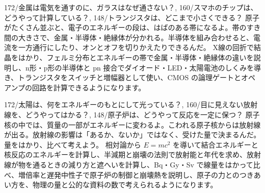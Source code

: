 %
  {172/{金属は電気を通すのに、ガラスはなぜ通さない？},
   160/{スマホのチップは、どうやって計算している？},
   148/{トランジスタは、どこまで小さくできる？}}%
  {原子がたくさん並ぶと、電子のエネルギーの段は、はばのある帯になるよ。帯のすき間の大きさで、金属・半導体・絶縁体が分かれる。半導体を組み合わせると、電流を一方通行にしたり、オンとオフを切りかえたりできるんだ。}%
  {X線の回折で結晶をはかり、フェルミ分布とエネルギーの帯で金属・半導体・絶縁体の違いを説明し、n形・p形の半導体と pn 接合でダイオード・LED・太陽電池のしくみを導き、トランジスタをスイッチと増幅器として使い、CMOS の論理ゲートとオペアンプの回路を計算できるようになります。}

\makeatletter{}\makeatother%
%
  {172/{太陽は、何をエネルギーのもとにして光っている？},
   160/{目に見えない放射線を、どうやってはかる？},
   148/{原子炉は、どうやって反応を一定に保つ？}}%
  {原子核の中では、質量の一部がエネルギーに変わるよ。こわれる原子核からは放射線が出る。放射線の影響は「あるか、ないか」ではなく、受けた量で決まるんだ。量をはかり、比べて考えよう。}%
  {相対論から $E=mc^2$ を導いて結合エネルギーと核反応のエネルギーを計算し、半減期と崩壊の法則で放射能と年代を求め、放射線が物を通るときの減り方と遮へいを計算し、Bq・Gy・Sv で線量をはかって比べ、増倍率と遅発中性子で原子炉の制御と崩壊熱を説明し、原子の力とのつきあい方を、物理の量と公的な資料の数で考えられるようになります。}


